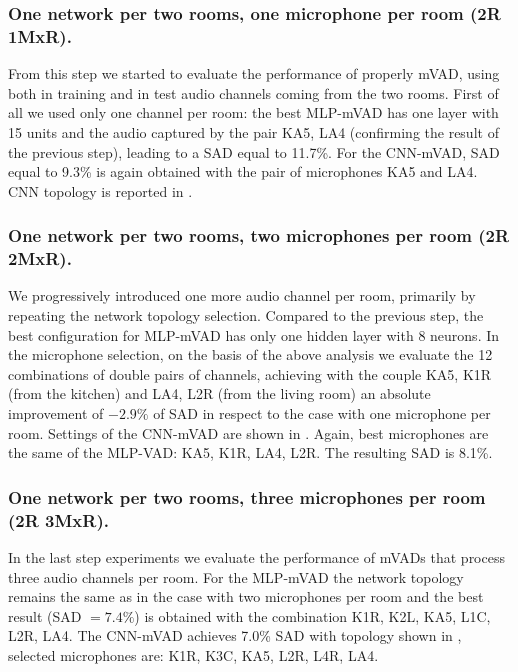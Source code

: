 \subsubsection{One network per two rooms, one microphone per room (2R 1MxR).}
From this step we started to evaluate the performance of properly mVAD, using both in training and in test audio channels coming from the two rooms. First of all we used only one channel per room: the best MLP-mVAD has one layer with 15 units and the audio captured by the pair KA5, LA4 (confirming the result of the previous step), leading to a SAD equal to 11.7\%. 
For the CNN-mVAD, SAD equal to 9.3\% is again obtained with the pair of microphones KA5 and LA4. CNN topology is reported in .


\subsubsection{One network per two rooms, two microphones per room (2R 2MxR).}
We progressively introduced one more audio channel per room, primarily by repeating the network topology selection. Compared to the previous step, the best configuration for MLP-mVAD has only one hidden layer with 8 neurons. In the microphone selection, on the basis of the above analysis %
we evaluate the 12 combinations of double pairs of channels, achieving with the couple KA5, K1R (from the kitchen) and LA4, L2R (from the living room) an absolute improvement of $-2.9\%$ of SAD in respect to the case with one microphone per room.
Settings of the CNN-mVAD are shown in . Again, best microphones are the same of the MLP-VAD: KA5, K1R, LA4, L2R. The resulting SAD is 8.1\%.

\subsubsection{One network per two rooms, three microphones per room (2R 3MxR).}
In the last step experiments we evaluate the performance of mVADs that process three audio channels per room. For the MLP-mVAD the network topology remains the same as in the case with two microphones per room and the best result (SAD $=7.4\%$) is obtained with the combination K1R, K2L, KA5, L1C, L2R, LA4. 
The CNN-mVAD achieves 7.0\% SAD with topology shown in , selected microphones are: K1R, K3C, KA5, L2R, L4R, LA4.
\vspace{-0.3cm}

